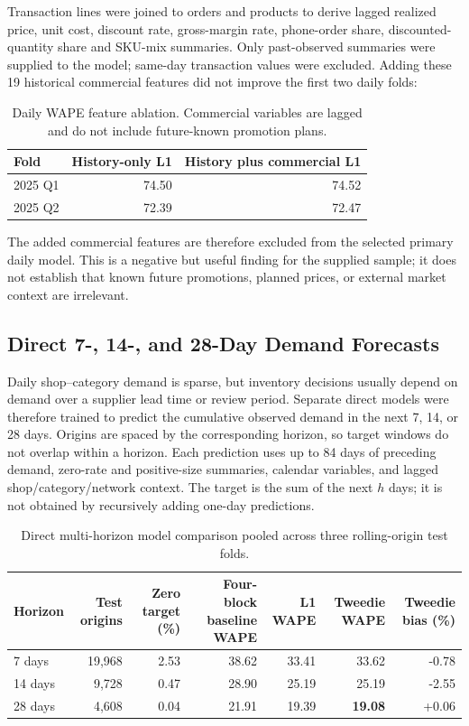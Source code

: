 Transaction lines were joined to orders and products to derive lagged realized price, unit cost, discount rate, gross-margin rate, phone-order share, discounted-quantity share and SKU-mix summaries. Only past-observed summaries were supplied to the model; same-day transaction values were excluded. Adding these 19 historical commercial features did not improve the first two daily folds:

\begin{table}[htbp]\centering\small
\caption{Daily WAPE feature ablation. Commercial variables are lagged and do not include future-known promotion plans.}
\begin{tabular}{lrr}\toprule
Fold & History-only L1 & History plus commercial L1\\\midrule
2025 Q1 & 74.50 & 74.52\\
2025 Q2 & 72.39 & 72.47\\\bottomrule
\end{tabular}
\end{table}

The added commercial features are therefore excluded from the selected primary daily model. This is a negative but useful finding for the supplied sample; it does not establish that known future promotions, planned prices, or external market context are irrelevant.

\subsection{Direct 7-, 14-, and 28-Day Demand Forecasts}

Daily shop--category demand is sparse, but inventory decisions usually depend on demand over a supplier lead time or review period. Separate direct models were therefore trained to predict the cumulative observed demand in the next 7, 14, or 28 days. Origins are spaced by the corresponding horizon, so target windows do not overlap within a horizon. Each prediction uses up to 84 days of preceding demand, zero-rate and positive-size summaries, calendar variables, and lagged shop/category/network context. The target is the sum of the next \(h\) days; it is not obtained by recursively adding one-day predictions.

\begin{table}[htbp]\centering\small
\caption{Direct multi-horizon model comparison pooled across three rolling-origin test folds.}
\begin{tabular}{lrrrrrr}\toprule
Horizon & Test origins & Zero target (\%) & Four-block baseline WAPE & L1 WAPE & Tweedie WAPE & Tweedie bias (\%)\\\midrule
7 days & 19,968 & 2.53 & 38.62 & 33.41 & 33.62 & -0.78\\
14 days & 9,728 & 0.47 & 28.90 & 25.19 & 25.19 & -2.55\\
28 days & 4,608 & 0.04 & 21.91 & 19.39 & \textbf{19.08} & +0.06\\\bottomrule
\end{tabular}
\end{table}


